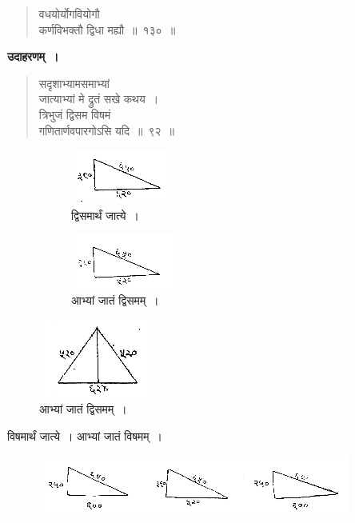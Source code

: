 \documentclass[11pt, openany]{book}
\begin{document}
\begin{quote}
    \bs 
 वधयोर्योगवियोगौ \\
कर्णविभक्तौ द्विधा मह्यौ~॥~१३०~॥~
\end{quote}

\textbf{उदाहरणम्~।} 
\begin{quote}
    \bqt 
     सदृशाभ्यामसमाभ्यां \\
जात्याभ्यां मे द्रुतं सखे कथय~। \\
 त्रिभुजं द्विसम विषमं\\
गणितार्णवपारगोऽसि यदि~॥~९२~॥~
\end{quote}

\begin{figure}[h!]
     \centering
     \begin{subfigure}[b]{0.45\textwidth}
         \centering
         \captionsetup{labelformat=empty}
          \caption{द्विसमार्थं जात्ये~।}
\vspace{-2mm}
         \includegraphics[scale=0.85]{graphics/capture167.png}
     \end{subfigure}
     \hfill
     \begin{subfigure}[b]{0.5\textwidth}
         \centering
         \captionsetup{labelformat=empty}
          \caption{आभ्यां जातं द्विसमम्~।}
\vspace{-2mm}
         \includegraphics[scale=0.85]{graphics/capture167'.png}
     \end{subfigure}
     \includegraphics[scale=0.85]{graphics/capture166.png}
\end{figure}

\newpage%
विषमार्थं जात्ये~। आभ्यां जातं विषमम्~।
\vspace{-2mm}

\begin{figure}[h!]
         \centering
         \includegraphics[scale=0.85]{graphics/capture167''.png}
     \end{figure}
     
\end{document}
